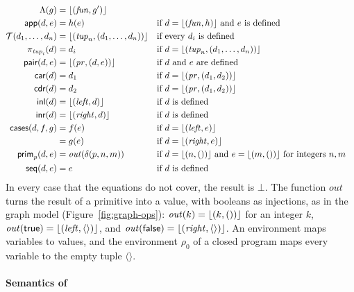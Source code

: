 \begin{align*}
  \Lambda(g) &= \lfloor (\mathit{fun}, g') \rfloor \\
  \mathsf{app}(d, e) &= h(e) &&\text{if } d = \lfloor (\mathit{fun}, h) \rfloor \text{ and } e \text{ is defined} \\
  \mathcal{T}(d_1, \ldots, d_n) &= \lfloor (\mathit{tup}_n, (d_1, \ldots, d_n)) \rfloor &&\text{if every } d_i \text{ is defined} \\
  \pi_{\mathit{tup}_i}(d) &= d_i &&\text{if } d = \lfloor (\mathit{tup}_n, (d_1, \ldots, d_n)) \rfloor \\
  \mathsf{pair}(d, e) &= \lfloor (\mathit{pr}, (d, e)) \rfloor &&\text{if } d \text{ and } e \text{ are defined} \\
  \mathsf{car}(d) &= d_1 &&\text{if } d = \lfloor (\mathit{pr}, (d_1, d_2)) \rfloor \\
  \mathsf{cdr}(d) &= d_2 &&\text{if } d = \lfloor (\mathit{pr}, (d_1, d_2)) \rfloor \\
  \mathsf{inl}(d) &= \lfloor (\mathit{left}, d) \rfloor &&\text{if } d \text{ is defined} \\
  \mathsf{inr}(d) &= \lfloor (\mathit{right}, d) \rfloor &&\text{if } d \text{ is defined} \\
  \mathsf{cases}(d, f, g) &= f(e) &&\text{if } d = \lfloor (\mathit{left}, e) \rfloor \\
   &= g(e) &&\text{if } d = \lfloor (\mathit{right}, e) \rfloor \\
  \mathsf{prim}_p(d, e) &= \mathit{out}(\delta(p, n, m)) &&\text{if } d = \lfloor (n, ()) \rfloor \text{ and } e = \lfloor (m, ()) \rfloor \text{ for integers } n, m \\
  \mathsf{seq}(d, e) &= e &&\text{if } d \text{ is defined}
\end{align*}
In every case that the equations do not cover, the result is $\bot$.
The function $\mathit{out}$ turns the result of a primitive into a
value, with booleans as injections, as in the graph model
(Figure~\ref{fig:graph-ops}): $\mathit{out}(k) = \lfloor (k, ()) \rfloor$
for an integer $k$, $\mathit{out}(\mathsf{true}) = \lfloor (\mathit{left}, \langle\rangle) \rfloor$,
and $\mathit{out}(\mathsf{false}) = \lfloor (\mathit{right}, \langle\rangle) \rfloor$.
An environment maps variables to values, and the environment $\rho_0$
of a closed program maps every variable to the empty tuple
$\langle\rangle$.

\paragraph{Semantics of \fpc}

